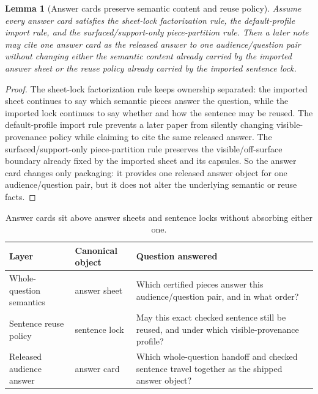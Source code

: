 \documentclass[11pt]{article}
\newtheorem{lemma}{Lemma}
\begin{document}
\begin{lemma}[Answer cards preserve semantic content and reuse policy]
Assume every answer card satisfies the sheet-lock factorization rule, the default-profile import rule, and the surfaced/support-only piece-partition rule.
Then a later note may cite one answer card as the released answer to one audience/question pair without changing either the semantic content already carried by the imported answer sheet or the reuse policy already carried by the imported sentence lock.
\end{lemma}

\begin{proof}
The sheet-lock factorization rule keeps ownership separated: the imported sheet continues to say which semantic pieces answer the question, while the imported lock continues to say whether and how the sentence may be reused.
The default-profile import rule prevents a later paper from silently changing visible-provenance policy while claiming to cite the same released answer.
The surfaced/support-only piece-partition rule preserves the visible/off-surface boundary already fixed by the imported sheet and its capsules.
So the answer card changes only packaging: it provides one released answer object for one audience/question pair, but it does not alter the underlying semantic or reuse facts.\qedhere
\end{proof}

\begin{table}[t]
\centering
\small
\begin{tabularx}{\linewidth}{@{}l l X@{}}
\toprule
Layer & Canonical object & Question answered \\
\midrule
Whole-question semantics & answer sheet & Which certified pieces answer this audience/question pair, and in what order? \\
Sentence reuse policy & sentence lock & May this exact checked sentence still be reused, and under which visible-provenance profile? \\
Released audience answer & answer card & Which whole-question handoff and checked sentence travel together as the shipped answer object? \\
\bottomrule
\end{tabularx}
\caption{Answer cards sit above answer sheets and sentence locks without absorbing either one.}
\label{tab:answercards}
\end{table}
\end{document}
